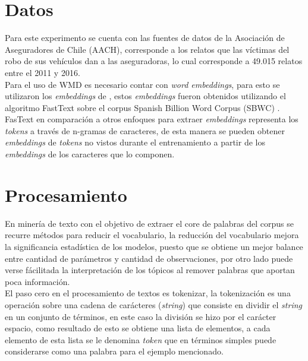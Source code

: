 \documentclass[letterpaper,12pt,oneside]{book} %
\begin{document}

\section{Datos}

Para este experimento se cuenta con las fuentes de datos de la Asociación de Aseguradores de Chile (AACH), corresponde a los relatos que las víctimas del robo de sus vehículos dan a las aseguradoras, lo cual corresponde a 49.015 relatos entre el 2011 y 2016.\\


Para el uso de WMD es necesario contar con \textit{word embeddings}, para esto se utilizaron los \textit{embeddings} de \citep{fastextSBWC}, estos \textit{embeddings} fueron obtenidos utilizando el algoritmo FastText \citep{bojanowski2017enriching} sobre el corpus Spanish Billion Word Corpus (SBWC) \citep{cardellinoSBWCE}. FasText en comparación a otros enfoques para extraer \textit{embeddings} representa los \textit{tokens} a través de n-gramas de caracteres, de esta manera se pueden obtener \textit{embeddings} de \textit{tokens} no vistos durante el entrenamiento a partir de los \textit{embeddings} de los caracteres que lo componen.

\section{Procesamiento}

En minería de texto con el objetivo de extraer el core de palabras del corpus se recurre métodos para reducir el vocabulario, la reducción del vocabulario mejora la significancia estadística de los modelos, puesto que se obtiene un mejor balance entre cantidad de parámetros y cantidad de observaciones, por otro lado puede verse fácilitada la interpretación de los tópicos al remover palabras que aportan poca información. \\

El paso cero en el procesamiento de textos es tokenizar, la tokenización es una operación sobre una cadena de carácteres (\textit{string}) que consiste en dividir el \textit{string} en un conjunto de términos, en este caso la división se hizo por el carácter espacio, como resultado de esto se obtiene una lista de elementos, a cada elemento de esta lista se le denomina \textit{token} que en términos simples puede considerarse como una palabra para el ejemplo mencionado. \\
\end{document}
